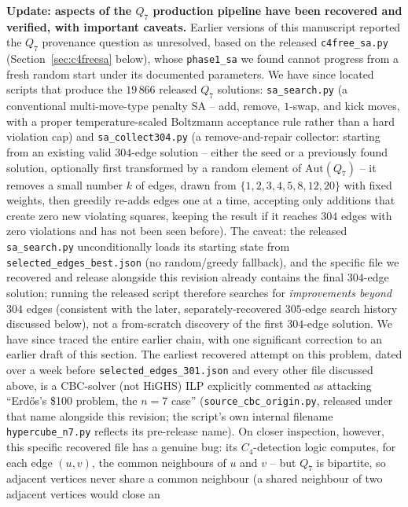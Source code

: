 \documentclass[12pt]{article}
\begin{document}
\noindent\textbf{Update: aspects of the $Q_7$ production pipeline have been
recovered and verified, with important caveats.} Earlier versions of this manuscript reported the $Q_7$
provenance question as unresolved, based on the released
\texttt{c4free\_sa.py} (Section~\ref{sec:c4freesa} below), whose
\texttt{phase1\_sa} we found cannot progress from a fresh random start
under its documented parameters. We have since located scripts
that produce the $19\,866$ released $Q_7$ solutions:
\texttt{sa\_search.py} (a conventional multi-move-type penalty SA --
add, remove, $1$-swap, and kick moves, with a proper temperature-scaled
Boltzmann acceptance rule rather than a hard violation cap) and
\texttt{sa\_collect304.py} (a remove-and-repair collector: starting
from an existing valid $304$-edge solution -- either the seed or a
previously found solution, optionally first transformed by a random
element of $\mathrm{Aut}(Q_7)$ -- it removes a small number $k$ of
edges, drawn from $\{1,2,3,4,5,8,12,20\}$ with fixed weights, then
greedily re-adds edges one at a time, accepting only additions that
create zero new violating squares, keeping the result if it reaches
$304$ edges with zero violations and has not been seen before). The
caveat: the released \texttt{sa\_search.py} unconditionally loads its
starting state from \texttt{selected\_edges\_best.json} (no
random/greedy fallback), and the specific file we recovered and
release alongside this revision already contains the final $304$-edge
solution; running the released script therefore searches for
\emph{improvements beyond} $304$ edges (consistent with the later,
separately-recovered $305$-edge search history discussed below), not a
from-scratch discovery of the first $304$-edge solution. We have
since traced the entire earlier chain, with one significant correction to an
earlier draft of this section. The
earliest recovered attempt on this problem, dated
over a week before \texttt{selected\_edges\_301.json} and every other
file discussed above, is a CBC-solver (not HiGHS) ILP explicitly commented as attacking
``Erd\H{o}s's \hbox{\$}100 problem, the $n=7$ case'' (\texttt{source\_cbc\_origin.py},
released under that name alongside this revision; the script's own
internal filename \texttt{hypercube\_n7.py} reflects its pre-release name). On closer inspection, however, this specific
recovered file has a genuine bug: its $C_4$-detection logic computes,
for each edge $(u,v)$, the common neighbours of $u$ and $v$ -- but
$Q_7$ is bipartite, so adjacent vertices never share a common
neighbour (a shared neighbour of two adjacent vertices would close an
\end{document}
